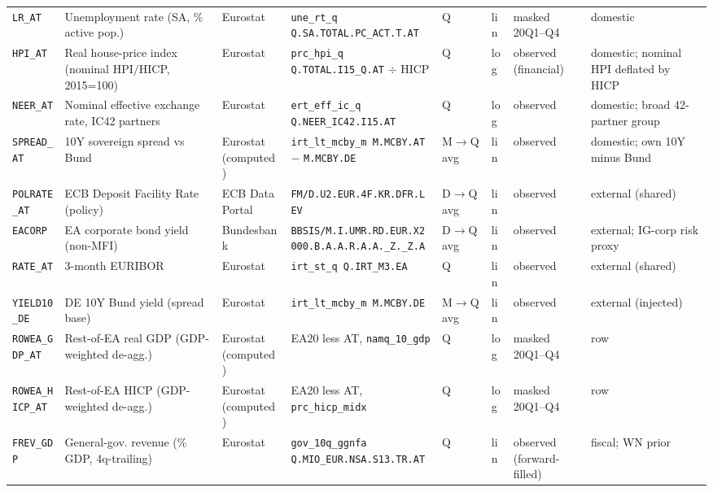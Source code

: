 \begin{longtable}{@{}p{}p{}p{}p{}p{}p{}p{}p{}@{}}
\texttt{LR\_AT}     & Unemployment rate (SA, \% active pop.) & Eurostat & \texttt{une\_rt\_q Q.\allowbreak SA.\allowbreak TOTAL.\allowbreak PC\_ACT.\allowbreak T.\allowbreak AT} & Q & lin & masked 20Q1--Q4 & domestic \\
\texttt{HPI\_AT}    & Real house-price index (nominal HPI$/$HICP, 2015=100) & Eurostat & \texttt{prc\_hpi\_q Q.\allowbreak TOTAL.\allowbreak I15\_Q.\allowbreak AT} $\div$ HICP & Q & log & observed (financial) & domestic; nominal HPI deflated by HICP \\
\texttt{NEER\_AT}   & Nominal effective exchange rate, IC42 partners & Eurostat & \texttt{ert\_eff\_ic\_q Q.\allowbreak NEER\_IC42.\allowbreak I15.\allowbreak AT} & Q & log & observed & domestic; broad 42-partner group \\
\texttt{SPREAD\_AT} & 10Y sovereign spread vs Bund & Eurostat (computed) & \texttt{irt\_lt\_mcby\_m M.\allowbreak MCBY.\allowbreak AT} $-$ \texttt{M.\allowbreak MCBY.\allowbreak DE} & M$\to$Q avg & lin & observed & domestic; own 10Y minus Bund \\
\texttt{POLRATE\_AT}& ECB Deposit Facility Rate (policy) & ECB Data Portal & \texttt{FM/D.\allowbreak U2.\allowbreak EUR.4F.\allowbreak KR.\allowbreak DFR.\allowbreak LEV} & D$\to$Q avg & lin & observed & external (shared) \\
\texttt{EACORP}     & EA corporate bond yield (non-MFI) & Bundesbank & \texttt{BBSIS/\allowbreak M.\allowbreak I.\allowbreak UMR.\allowbreak RD.\allowbreak EUR.\allowbreak X2000.\allowbreak B.A.A.\allowbreak R.A.A.\allowbreak \_Z.\_Z.A} & D$\to$Q avg & lin & observed & external; IG-corp risk proxy \\
\texttt{RATE\_AT}   & 3-month EURIBOR & Eurostat & \texttt{irt\_st\_q Q.\allowbreak IRT\_M3.\allowbreak EA} & Q & lin & observed & external (shared) \\
\texttt{YIELD10\_DE}& DE 10Y Bund yield (spread base) & Eurostat & \texttt{irt\_lt\_mcby\_m M.\allowbreak MCBY.\allowbreak DE} & M$\to$Q avg & lin & observed & external (injected) \\
\texttt{ROWEA\_GDP\_AT}  & Rest-of-EA real GDP (GDP-weighted de-agg.) & Eurostat (computed) & EA20 less AT, \texttt{namq\_10\_gdp} & Q & log & masked 20Q1--Q4 & row \\
\texttt{ROWEA\_HICP\_AT} & Rest-of-EA HICP (GDP-weighted de-agg.) & Eurostat (computed) & EA20 less AT, \texttt{prc\_hicp\_midx} & Q & log & masked 20Q1--Q4 & row \\
\texttt{FREV\_GDP}  & General-gov. revenue (\% GDP, 4q-trailing) & Eurostat & \texttt{gov\_10q\_ggnfa Q.\allowbreak MIO\_EUR.\allowbreak NSA.\allowbreak S13.\allowbreak TR.\allowbreak AT} & Q & lin & observed (forward-filled) & fiscal; WN prior \\

\end{longtable}
